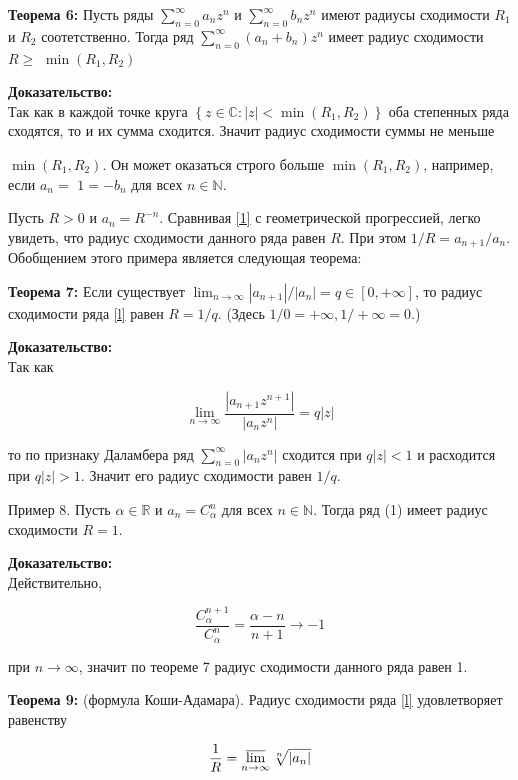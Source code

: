 \documentclass[a4paper,12pt]{article} %
\begin{document}
\textbf{Теорема 6:} Пусть ряды $\sum_{n=0}^{\infty} a_{n} z^{n}$ и $\sum_{n=0}^{\infty} b_{n} z^{n}$ имеют радиусы сходимости $R_{1}$ и $R_{2}$ соотетственно. Тогда ряд $\sum_{n=0}^{\infty}\left(a_{n}+b_{n}\right) z^{n}$ имеет радиус сходимости $R \geq$ $\min \left(R_{1}, R_{2}\right)$

\textbf{Доказательство:}\\
Так как в каждой точке круга $\left\{z \in \mathbb{C}:|z|<\min \left(R_{1}, R_{2}\right)\right\}$ оба степенных ряда сходятся, то и их сумма сходится. Значит радиус сходимости суммы не меньше


$\min \left(R_{1}, R_{2}\right)$. Он может оказаться строго больше $\min \left(R_{1}, R_{2}\right)$, например, если $a_{n}=$ $1=-b_{n}$ для всех $n \in \mathbb{N}$.

Пусть $R>0$ и $a_{n}=R^{-n}$. Сравнивая \eqref{1} с геометрической прогрессией, легко увидеть, что радиус сходимости данного ряда равен $R$. При этом $1 / R=a_{n+1} / a_{n}$. Обобщением этого примера является следующая теорема:

\textbf{Теорема 7:} Если существует $\lim _{n \rightarrow \infty}\left|a_{n+1}\right| /\left|a_{n}\right|=q \in[0,+\infty]$, то радиус сходимости ряда \eqref{l} равен $R=1 / q$. (Здесь $1 / 0=+\infty, 1 /+\infty=0$.)

\textbf{Доказательство:}\\
Так как

$$
\lim _{n \rightarrow \infty} \frac{\left|a_{n+1} z^{n+1}\right|}{\left|a_{n} z^{n}\right|}=q|z|
$$

то по признаку Даламбера ряд $\sum_{n=0}^{\infty}\left|a_{n} z^{n}\right|$ сходится при $q|z|<1$ и расходится при $q|z|>1$. Значит его радиус сходимости равен $1 / q$.

Пример 8. Пусть $\alpha \in \mathbb{R}$ и $a_{n}=C_{\alpha}^{n}$ для всех $n \in \mathbb{N}$. Тогда ряд (1) имеет радиус сходимости $R=1$.

\textbf{Доказательство:}\\
Действительно,

$$
\frac{C_{\alpha}^{n+1}}{C_{\alpha}^{n}}=\frac{\alpha-n}{n+1} \rightarrow-1
$$

при $n \rightarrow \infty$, значит по теореме 7 радиус сходимости данного ряда равен 1.

\textbf{Теорема 9:} (формула Коши-Адамара). Радиус сходимости ряда \eqref{l} удовлетворяет равенству

\begin{equation}\label{3}
\frac{1}{R}=\varlimsup_{n \rightarrow \infty} \sqrt[n]{\left|a_{n}\right|}
\end{equation}
\end{document}
